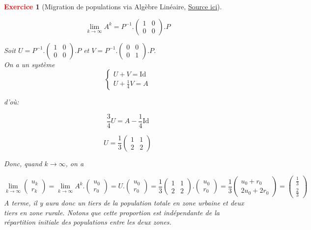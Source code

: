 \documentclass[11pt]{article}
\theoremstyle{mythmstyle}
\newtheorem{exo}{\textcolor{red}{\textbf{Exercice}}}
\begin{document}
\begin{exo}[Migration de populations via Algèbre Linéaire, \href{http://math.univ-lyon1.fr/homes-www/malbos/Ens/amalaa11.pdf}{Source ici}]
\begin{enumerate}
\begin{solution}
    $$
    \lim_{k\to \infty}A^k=P^{-1}.\begin{pmatrix}1& 0\\ 0& 0\end{pmatrix}.P
    $$
    
    Soit $U= P^{-1}.\begin{pmatrix}1& 0\\ 0& 0\end{pmatrix}.P$ et $V= P^{-1}.\begin{pmatrix}0& 0\\ 0& 1\end{pmatrix}.P$. \\
    
    On a un système
    $$
    \begin{cases}
    U+V= \mathrm{Id}\\
    U+ \frac{1}{4}V=A
    \end{cases}
    $$
    
    d'où:
    
    $$
    \frac{3}{4}U=A-\frac{1}{4}\mathrm{Id}
    $$
    
    $$
    U=\frac{1}{3}\begin{pmatrix} 1&1\\2&2\end{pmatrix}
    $$
    
    Donc, quand $k\to \infty$, on a 
    
    $$
    \lim_{k\to \infty} \begin{pmatrix} u_{k}\\r_{k}\end{pmatrix}= \lim_{k\to \infty} A^k. \begin{pmatrix} u_{0}\\r_{0}\end{pmatrix} = U.\begin{pmatrix} u_{0}\\r_{0}\end{pmatrix}=\frac{1}{3}\begin{pmatrix} 1&1\\2&2\end{pmatrix}.\begin{pmatrix} u_{0}\\r_{0}\end{pmatrix}=\frac{1}{3}\begin{pmatrix} u_{0}+r_{0}\\ 2u_0+2r_0\end{pmatrix}= \begin{pmatrix} \frac{1}{3}\\ \frac{2}{3}\end{pmatrix}
    $$
    A terme, il y aura donc un tiers de la population totale en zone urbaine et deux tiers en zone rurale. Notons que cette proportion est indépendante de la répartition initiale des populations entre les deux zones.
\end{solution}
\end{enumerate}
\end{exo}
 
\end{document}
